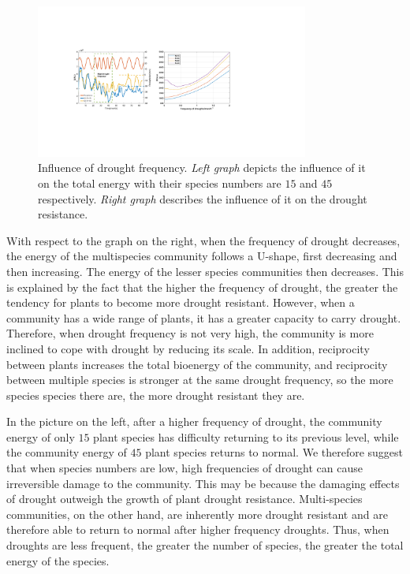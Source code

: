 \documentclass[12pt]{article}  %
\begin{document}
\begin{figure}[htbp]
	\centering
	\includegraphics[width=0.8\textwidth]{easymcm/img/fre.pdf}
	\caption{Influence of drought frequency. \textit{Left graph} depicts the influence of it on the total energy with their species numbers are $15$ and $45$ respectively. \textit{Right graph} describes the influence of it on the drought resistance.}
 \label{fig:fre}
\end{figure}

\vspace{-0.5cm}
With respect to the graph on the right, when the frequency of drought decreases, the energy of the multispecies community follows a U-shape, first decreasing and then increasing. The energy of the lesser species communities then decreases. This is explained by the fact that the higher the frequency of drought, the greater the tendency for plants to become more drought resistant. However, when a community has a wide range of plants, it has a greater capacity to carry drought. Therefore, when drought frequency is not very high, the community is more inclined to cope with drought by reducing its scale. In addition, reciprocity between plants increases the total bioenergy of the community, and reciprocity between multiple species is stronger at the same drought frequency, so the more species species there are, the more drought resistant they are.

In the picture on the left, after a higher frequency of drought, the community energy of only $15$ plant species has difficulty returning to its previous level, while the community energy of $45$ plant species returns to normal. We therefore suggest that when species numbers are low, high frequencies of drought can cause irreversible damage to the community. This may be because the damaging effects of drought outweigh the growth of plant drought resistance. Multi-species communities, on the other hand, are inherently more drought resistant and are therefore able to return to normal after higher frequency droughts. Thus, when droughts are less frequent, the greater the number of species, the greater the total energy of the species.
\end{document}

